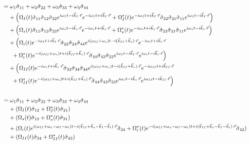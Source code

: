 \documentclass[aps,pra,showpacs,amsmath,amssymb,nofootinbib,longbibliography,superscriptaddress
]{revtex4-1}
\theoremstyle{definition}
\theoremstyle{remark}
\newcommand{\0}{\hat{0}}
\begin{document}
\begin{align}
    &= \omega_1 \hat{\sigma}_{11} + \omega_2 \hat{\sigma}_{22} + \omega_3 \hat{\sigma}_{33} + \omega_4 \hat{\sigma}_{44} \nonumber \\
    &\;\;\;\;+  \left(\Omega_{I}(t) \hat{\sigma}_{11} \hat{\sigma}_{12} \hat{\sigma}_{22} e^{i \omega_I t - i \vec{k}_I \cdot \vec{r}}  e^{-i \omega_I t + i \vec{k}_I \cdot \vec{r}} + \Omega_{I}^*(t) e^{-i \omega_I t + i \vec{k}_I \cdot \vec{r}} \hat{\sigma}_{22} \hat{\sigma}_{21} \hat{\sigma}_{11} e^{i \omega_I t - i \vec{k}_I \cdot \vec{r}}\right)\nonumber \\
    &\;\;\;\;+ \left(\Omega_{s}(t) \hat{\sigma}_{11} \hat{\sigma}_{13} \hat{\sigma}_{33} e^{i \omega_s t - i \vec{k}_s \cdot \vec{r}} e^{-i \omega_s t + i \vec{k}_{s} \cdot \vec{r}} + \Omega_{s}^*(t) e^{-i \omega_s t + i \vec{k}_s \cdot \vec{r}} \hat{\sigma}_{33} \hat{\sigma}_{31} \hat{\sigma}_{11} e^{i \omega_s t - i \vec{k}_{s} \cdot \vec{r}}\right)\nonumber \\
    &\;\;\;\;+ \Bigl(\Omega_{i}(t) e^{-i \omega_I t + i \vec{k}_I \cdot \vec{r}} \hat{\sigma}_{22} \hat{\sigma}_{24} \hat{\sigma}_{44} e^{i(\omega_{II} + \omega_s) t - i(\vec{k}_{II} + \vec{k}_s) \cdot \vec{r}} e^{-i \omega_i t + i \vec{k}_{i} \cdot \vec{r}} \nonumber \\
    &\;\;\;\;\;\;+ \Omega_{i}^*(t) e^{-i(\omega_{II} + \omega_s) t + i(\vec{k}_{II} + \vec{k}_s) \cdot \vec{r}} \hat{\sigma}_{44} \hat{\sigma}_{42} \hat{\sigma}_{22} e^{i \omega_I t - i \vec{k}_I \cdot \vec{r}} e^{i \omega_i t - i \vec{k}_{i} \cdot \vec{r}}\Bigr)\nonumber \\
    &\;\;\;\;+ \Bigl(\Omega_{II}(t) e^{-i \omega_s t + i \vec{k}_s \cdot \vec{r}} \hat{\sigma}_{33} \hat{\sigma}_{34} \hat{\sigma}_{44} e^{i(\omega_{II} + \omega_s) t - i(\vec{k}_{II} + \vec{k}_s) \cdot \vec{r}} e^{-i \omega_{II} t + i \vec{k}_{II} \cdot \vec{r}} \nonumber \\
    &\;\;\;\;\;\;+ \Omega_{II}^*(t) e^{-i(\omega_{II} + \omega_s) t + i(\vec{k}_{II} + \vec{k}_s) \cdot \vec{r}} \hat{\sigma}_{44} \hat{\sigma}_{43} \hat{\sigma}_{33} e^{i \omega_s t - i \vec{k}_s \cdot \vec{r}} e^{i \omega_{II} t - i \vec{k}_{II} \cdot \vec{r}}\Bigr) \nonumber \\ \nonumber \\
    &= \omega_1 \hat{\sigma}_{11} + \omega_2 \hat{\sigma}_{22} + \omega_3 \hat{\sigma}_{33} + \omega_4 \hat{\sigma}_{44} \nonumber \\
    &\;\;\;\;+ \left(\Omega_{I}(t) \hat{\sigma}_{12} + \Omega_{I}^*(t) \hat{\sigma}_{21} \right)\nonumber \\
    &\;\;\;\;+ \left(\Omega_{s}(t) \hat{\sigma}_{13} + \Omega_{s}^*(t) \hat{\sigma}_{31} \right)\nonumber \\
    &\;\;\;\;+ (\Omega_{i}(t) e^{i(\omega_{II} + \omega_s - \omega_I - \omega_i) t - i(\vec{k}_{II} + \vec{k}_s - \vec{k}_I - \vec{k}_{i}) \cdot \vec{r}} \hat{\sigma}_{24} + \Omega_{i}^*(t) e^{-i(\omega_{II} + \omega_s - \omega_I - \omega_i) t + i(\vec{k}_{II} + \vec{k}_s - \vec{k}_I - \vec{k}_{i}) \cdot \vec{r}} \hat{\sigma}_{42} )\nonumber \\
    &\;\;\;\;+ (\Omega_{II}(t) \hat{\sigma}_{34} + \Omega_{II}^*(t) \hat{\sigma}_{43} )
\end{align}
\end{document}
